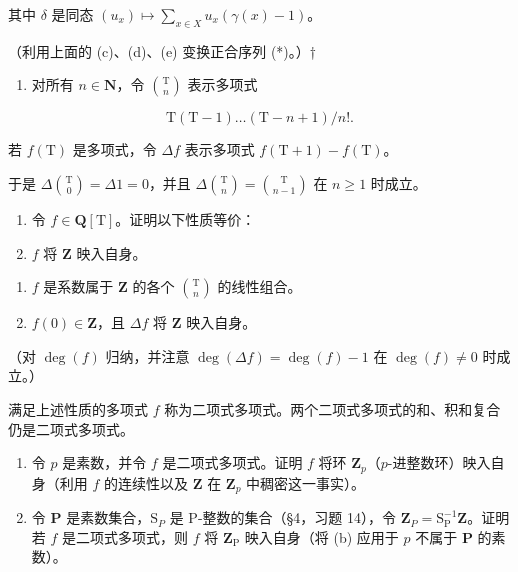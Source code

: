 其中 \(\delta\) 是同态 \((u_x) \mapsto \sum_{x \in X} u_x(\gamma(x) - 1)\)。

（利用上面的 (c)、(d)、(e) 变换正合序列 (*)。）†

\begin{enumerate}
\def\labelenumi{\arabic{enumi}.}
\setcounter{enumi}{3}
\tightlist
\item
  对所有 \(n \in \mathbf{N}\)，令 \(\binom{\mathrm{T}}{n}\) 表示多项式
\end{enumerate}

\[
\mathrm{T} (\mathrm{T} - 1) \dots (\mathrm{T} - n + 1) / n!.
\]

若 \(f(\mathrm{T})\) 是多项式，令 \(\Delta f\) 表示多项式 \(f(\mathrm{T} + 1) - f(\mathrm{T})\)。

于是 \(\Delta\binom{\mathrm{T}}{0} = \Delta 1 = 0\)，并且 \(\Delta\binom{\mathrm{T}}{n} = \binom{\mathrm{T}}{n - 1}\) 在 \(n \geqslant 1\) 时成立。

\begin{enumerate}
\def\labelenumi{(\alph{enumi})}
\item
  令 \(f \in \mathbf{Q}[\mathrm{T}]\)。证明以下性质等价：
\item
  \(f\) 将 \(\mathbf{Z}\) 映入自身。
\end{enumerate}

\begin{enumerate}
\def\labelenumi{(\roman{enumi})}
\setcounter{enumi}{1}
\item
  \(f\) 是系数属于 \(\mathbf{Z}\) 的各个 \(\binom{\mathrm{T}}{n}\) 的线性组合。
\item
  \(f(0)\in \mathbf{Z}\)，且 \(\Delta f\) 将 \(\mathbf{Z}\) 映入自身。
\end{enumerate}

（对 \(\deg(f)\) 归纳，并注意 \(\deg(\Delta f) = \deg(f) - 1\) 在 \(\deg(f) \neq 0\) 时成立。）

满足上述性质的多项式 \(f\) 称为二项式多项式。两个二项式多项式的和、积和复合仍是二项式多项式。

\begin{enumerate}
\def\labelenumi{(\alph{enumi})}
\setcounter{enumi}{1}
\item
  令 \(p\) 是素数，并令 \(f\) 是二项式多项式。证明 \(f\) 将环 \(\mathbf{Z}_p\)（\(p\)-进整数环）映入自身（利用 \(f\) 的连续性以及 \(\mathbf{Z}\) 在 \(\mathbf{Z}_p\) 中稠密这一事实）。
\item
  令 \(\mathbf{P}\) 是素数集合，\(\mathrm{S}_P\) 是 P-整数的集合（§4，习题 14），令 \(\mathbf{Z}_P = \mathrm{S}_{\mathrm{P}}^{-1}\mathbf{Z}\)。证明若 \(f\) 是二项式多项式，则 \(f\) 将 \(\mathbf{Z}_{\mathrm{P}}\) 映入自身（将 (b) 应用于 \(p\) 不属于 \(\mathbf{P}\) 的素数）。
\end{enumerate}

